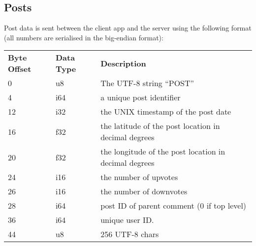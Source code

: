 \documentclass[12pt, a4paper]{article}
\begin{document}
\subsection{Posts}
Post data is sent between the client app and the server using the following format (all numbers are serialised in the big-endian format):
\begin{table}[h]
\centering
\begin{tabular}{lll}
\textbf{Byte Offset} & \textbf{Data Type} &\textbf{Description}\\
0 & u8 & The UTF-8 string ``POST''\\
4 & i64 & a unique post identifier\\
12 & i32 & the UNIX timestamp of the post date\\
16 & f32 & the latitude of the post location in decimal degrees\\
20 & f32 & the longitude of the post location in decimal degrees\\
24 & i16 & the number of upvotes\\
26 & i16 & the number of downvotes\\
28 & i64 & post ID of parent comment (0 if top level)\\
36 & i64 & unique user ID.\\
44 & u8 & 256 UTF-8 chars \\
\end{tabular}
\end{table}
\clearpage
\end{document}
